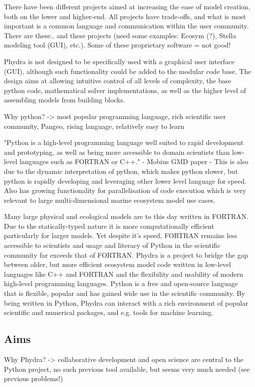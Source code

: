 \documentclass[journal abbreviation, manuscript]{copernicus}
\begin{document}
There have been different projects aimed at increasing the ease of model creation, both on the lower and higher-end. All projects have trade-offs, and what is most important is a common language and communication within the user community.
There are these.. and these projects (need some examples: Ecosym (?), Stella modeling tool (GUI), etc.).
Some of these proprietary software = not good!

Phydra is not designed to be specifically used with a graphical user interface (GUI), although such functionality could be added to the modular code base.
The design aims at allowing intuitive control of all levels of complexity, the base python code, mathematical solver implementations, as well as the higher level of assembling models from building blocks.

Why python? -> most popular programming language, rich scientific user community, Pangeo, rising language, relatively easy to learn

"Python is a high-level programming language well suited to rapid development and prototyping, as well as being more accessible to domain scientists than low-level languages such as FORTRAN or C++." - Mobius GMD paper
- This is also due to the dynamic interpretation of python, which makes python slower, but python is rapidly developing and leveraging other lower level language for speed. Also has growing functionality for parallelisation of code execution which is very relevant to large multi-dimensional marine ecosystem model use cases. 

Many large physical and ecological models are to this day written in FORTRAN. Due to the statically-typed nature it is more computationally efficient particularly for larger models. Yet despite it's speed, FORTRAN remains less accessible to scientists and usage and literacy of Python in the scientific community far exceeds that of FORTRAN.
Phydra is a project to bridge the gap between older, but more efficient ecosystem model code written in low-level languages like C++ and FORTRAN and the flexibility and usability of modern high-level programming languages. Python is a free and open-source language that is flexible, popular and has gained wide use in the scientific community. By being written in Python, Phydra can interact with a rich environment of popular scientific and numerical packages, and e.g. tools for machine learning. 


\subsection{Aims}
Why Phydra? -> collaborative development and open science are central to the Python project, no such previous tool available, but seems very much needed (see previous problems!)
\end{document}
